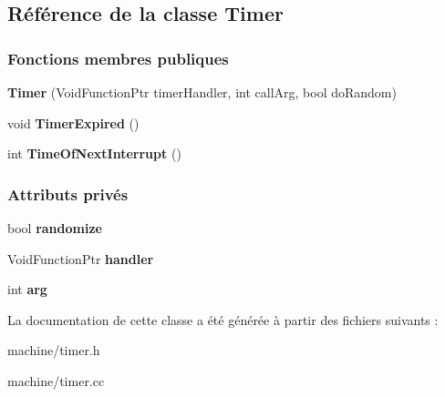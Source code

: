 \hypertarget{class_timer}{}\subsection{Référence de la classe Timer}
\label{class_timer}
\subsubsection*{Fonctions membres publiques}
\begin{DoxyCompactItemize}
\item 
\hypertarget{class_timer_ad6f578a6b75f1073e7c6919cf8a507ee}{}\label{class_timer_ad6f578a6b75f1073e7c6919cf8a507ee} 
{\bfseries Timer} (Void\+Function\+Ptr timer\+Handler, int call\+Arg, bool do\+Random)
\item 
\hypertarget{class_timer_ad0198c93d207f2f303b3c5ff5cfd8ef4}{}\label{class_timer_ad0198c93d207f2f303b3c5ff5cfd8ef4} 
void {\bfseries Timer\+Expired} ()
\item 
\hypertarget{class_timer_a2846bc4b6ef4ad61e3de987aee4d85ab}{}\label{class_timer_a2846bc4b6ef4ad61e3de987aee4d85ab} 
int {\bfseries Time\+Of\+Next\+Interrupt} ()
\end{DoxyCompactItemize}
\subsubsection*{Attributs privés}
\begin{DoxyCompactItemize}
\item 
\hypertarget{class_timer_a221fbcd81d3645fd1b36911f30936784}{}\label{class_timer_a221fbcd81d3645fd1b36911f30936784} 
bool {\bfseries randomize}
\item 
\hypertarget{class_timer_a39b322722907d241657a278e9eccacd0}{}\label{class_timer_a39b322722907d241657a278e9eccacd0} 
Void\+Function\+Ptr {\bfseries handler}
\item 
\hypertarget{class_timer_a59d6fe9dd17e2162f31a77f702e43b4e}{}\label{class_timer_a59d6fe9dd17e2162f31a77f702e43b4e} 
int {\bfseries arg}
\end{DoxyCompactItemize}


La documentation de cette classe a été générée à partir des fichiers suivants \+:\begin{DoxyCompactItemize}
\item 
machine/timer.\+h\item 
machine/timer.\+cc\end{DoxyCompactItemize}
